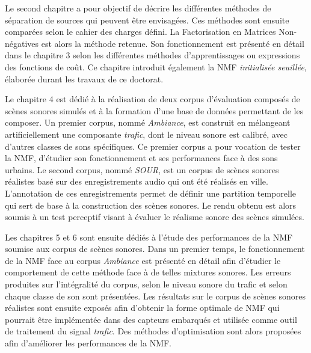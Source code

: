 Le second chapitre a pour objectif de décrire les différentes méthodes de séparation de sources qui peuvent être envisagées. Ces méthodes sont ensuite comparées selon le cahier des charges défini. La Factorisation en Matrices Non-négatives est alors la méthode retenue. 
Son fonctionnement est présenté en détail dans le chapitre 3 selon les différentes méthodes d'apprentissages ou expressions des fonctions de coût. Ce chapitre introduit également la NMF \textit{initialisée seuillée}, élaborée durant les travaux de ce doctorat. 

Le chapitre 4 est dédié à la réalisation de deux corpus d'évaluation composés de scènes sonores simulés et à la formation d'une base de données permettant de les composer. 
Un premier corpus, nommé \textit{Ambiance}, est construit en mélangeant artificiellement une composante \textit{trafic}, dont le niveau sonore est calibré, avec d'autres classes de sons spécifiques. Ce premier corpus a pour vocation de tester la NMF, d'étudier son fonctionnement et ses performances face à des sons urbains. 
Le second corpus, nommé \textit{SOUR}, est un corpus de scènes sonores réalistes basé sur des enregistrements audio qui ont été réalisés en ville.
L'annotation de ces enregistrements permet de définir une partition temporelle qui sert de base à la construction des scènes sonores. Le rendu obtenu est alors soumis à un test perceptif visant à évaluer le réalisme sonore des scènes simulées. 

Les chapitres 5 et 6 sont ensuite dédiés à l'étude des performances de la NMF soumise aux corpus de scènes sonores. Dans un premier temps, le fonctionnement de la NMF face au corpus \textit{Ambiance} est présenté en détail afin d'étudier le comportement de cette méthode face à de telles mixtures sonores. Les erreurs produites sur l'intégralité du corpus, selon le niveau sonore du trafic et selon chaque classe de son sont présentées. 
Les résultats sur le corpus de scènes sonores réalistes sont ensuite exposés afin d'obtenir la forme optimale de NMF qui pourrait être implémentée dans des capteurs embarqués et utilisée comme outil de traitement du signal \textit{trafic}. Des méthodes d'optimisation sont alors proposées afin d'améliorer les performances de la NMF.